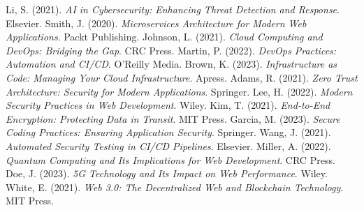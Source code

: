 \begin{multicols}{2}
\begin{thebibliography}{99}
 Li, S. (2021). \textit{AI in Cybersecurity: Enhancing Threat Detection and Response}. Elsevier.
 Smith, J. (2020). \textit{Microservices Architecture for Modern Web Applications}. Packt Publishing.
 Johnson, L. (2021). \textit{Cloud Computing and DevOps: Bridging the Gap}. CRC Press.
 Martin, P. (2022). \textit{DevOps Practices: Automation and CI/CD}. O'Reilly Media.
 Brown, K. (2023). \textit{Infrastructure as Code: Managing Your Cloud Infrastructure}. Apress.
 Adams, R. (2021). \textit{Zero Trust Architecture: Security for Modern Applications}. Springer.
 Lee, H. (2022). \textit{Modern Security Practices in Web Development}. Wiley.
 Kim, T. (2021). \textit{End-to-End Encryption: Protecting Data in Transit}. MIT Press.
 Garcia, M. (2023). \textit{Secure Coding Practices: Ensuring Application Security}. Springer.
 Wang, J. (2021). \textit{Automated Security Testing in CI/CD Pipelines}. Elsevier.
 Miller, A. (2022). \textit{Quantum Computing and Its Implications for Web Development}. CRC Press.
 Doe, J. (2023). \textit{5G Technology and Its Impact on Web Performance}. Wiley.
 White, E. (2021). \textit{Web 3.0: The Decentralized Web and Blockchain Technology}. MIT Press.
\end{thebibliography}
\end{multicols}
